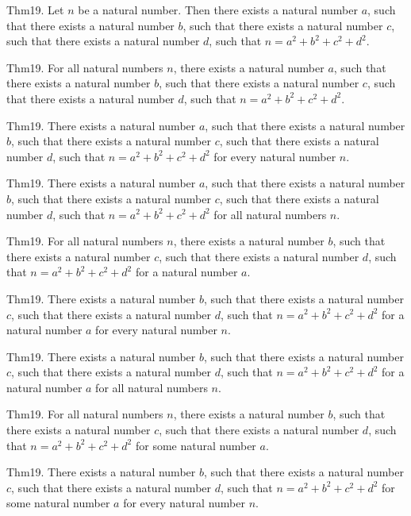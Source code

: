 \documentclass{article}
\begin{document}
Thm19. Let $n$ be a natural number. Then there exists a natural number $a$, such that there exists a natural number $b$, such that there exists a natural number $c$, such that there exists a natural number $d$, such that $n = a ^{ 2}+ b ^{ 2}+ c ^{ 2}+ d ^{ 2}$.

Thm19. For all natural numbers $n$, there exists a natural number $a$, such that there exists a natural number $b$, such that there exists a natural number $c$, such that there exists a natural number $d$, such that $n = a ^{ 2}+ b ^{ 2}+ c ^{ 2}+ d ^{ 2}$.

Thm19. There exists a natural number $a$, such that there exists a natural number $b$, such that there exists a natural number $c$, such that there exists a natural number $d$, such that $n = a ^{ 2}+ b ^{ 2}+ c ^{ 2}+ d ^{ 2}$ for every natural number $n$.

Thm19. There exists a natural number $a$, such that there exists a natural number $b$, such that there exists a natural number $c$, such that there exists a natural number $d$, such that $n = a ^{ 2}+ b ^{ 2}+ c ^{ 2}+ d ^{ 2}$ for all natural numbers $n$.

Thm19. For all natural numbers $n$, there exists a natural number $b$, such that there exists a natural number $c$, such that there exists a natural number $d$, such that $n = a ^{ 2}+ b ^{ 2}+ c ^{ 2}+ d ^{ 2}$ for a natural number $a$.

Thm19. There exists a natural number $b$, such that there exists a natural number $c$, such that there exists a natural number $d$, such that $n = a ^{ 2}+ b ^{ 2}+ c ^{ 2}+ d ^{ 2}$ for a natural number $a$ for every natural number $n$.

Thm19. There exists a natural number $b$, such that there exists a natural number $c$, such that there exists a natural number $d$, such that $n = a ^{ 2}+ b ^{ 2}+ c ^{ 2}+ d ^{ 2}$ for a natural number $a$ for all natural numbers $n$.

Thm19. For all natural numbers $n$, there exists a natural number $b$, such that there exists a natural number $c$, such that there exists a natural number $d$, such that $n = a ^{ 2}+ b ^{ 2}+ c ^{ 2}+ d ^{ 2}$ for some natural number $a$.

Thm19. There exists a natural number $b$, such that there exists a natural number $c$, such that there exists a natural number $d$, such that $n = a ^{ 2}+ b ^{ 2}+ c ^{ 2}+ d ^{ 2}$ for some natural number $a$ for every natural number $n$.
\end{document}
